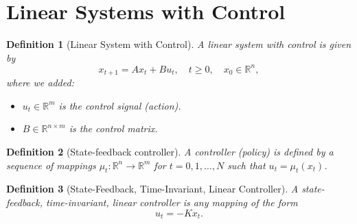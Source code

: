 \documentclass[a4 paper]{article}
\numberwithin{equation}{section}
\theoremstyle{boldStyle}
\theoremstyle{boldBlueStyle}
\theoremstyle{boldPurpleStyle}
\theoremstyle{boldRedStyle}
\newtheorem{definition}{Definition}[section]
\begin{document}
\newpage
\section{Linear Systems with Control}

\begin{definition}[Linear System with Control]
  A linear system with control is given by
  \begin{equation}
      x_{t+1} = A x_t + B u_t, \quad t \geq 0, \quad x_0 \in \mathbb{R}^n,
  \end{equation}
  where we added:
  \begin{itemize}
      \item \( u_t \in \mathbb{R}^m \) is the control signal (action).
      \item \( B \in \mathbb{R}^{n \times m} \) is the control matrix.
  \end{itemize}
\end{definition}

\begin{definition}[State-feedback controller]
  A controller (policy) is defined by a sequence of mappings \( \mu_t : \mathbb{R}^n \to \mathbb{R}^m \) 
  for \( t = 0, 1, \ldots, N \) such that \( u_t = \mu_t(x_t) \).  
\end{definition}
  

\begin{definition}[State-Feedback, Time-Invariant, Linear Controller]
A state-feedback, time-invariant, linear controller is any mapping of the form
\[
u_t = -K x_t.
\]
\end{definition}
\end{document}
